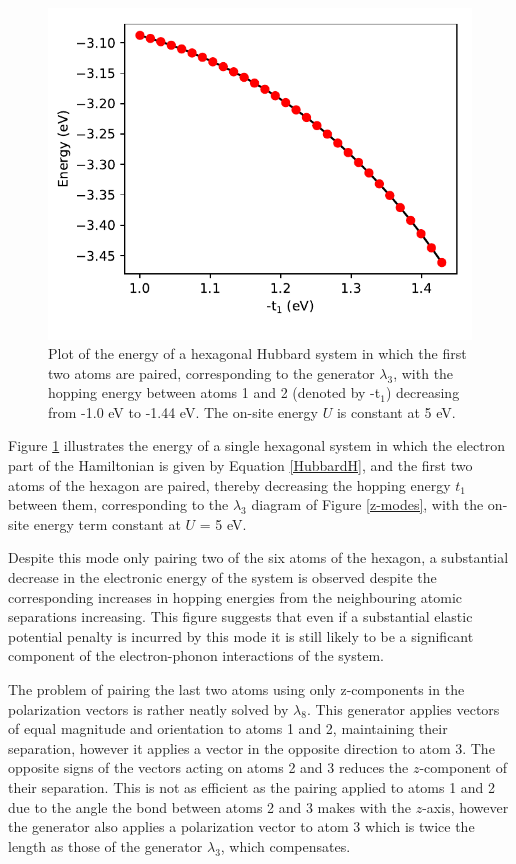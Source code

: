 \documentclass[prb,showpacs,superscriptaddress,titlepage,amsmath,amssymb,twocolumn]{revtex4-1}
\begin{document}
\begin{figure}
	\includegraphics[width=\columnwidth]{t1}
	\caption{Plot of the energy of a hexagonal Hubbard system in which the first two atoms are paired, corresponding to the generator $\lambda_{3}$, with the hopping energy between atoms 1 and 2 (denoted by -t$_{1}$) decreasing from -1.0 eV to -1.44 eV. The on-site energy $U$ is constant at 5 eV.}
	\label{t1}
\end{figure}

Figure \ref{t1} illustrates the energy of a single hexagonal system in which the electron part of the Hamiltonian is given by Equation \ref{HubbardH}, and the first two atoms of the hexagon are paired, thereby decreasing the hopping energy $t_{1}$ between them, corresponding to the $\lambda_{3}$ diagram of Figure \ref{z-modes}, with the on-site energy term constant at $U$ = 5 eV.  

Despite this mode only pairing two of the six atoms of the hexagon, a substantial decrease in the electronic energy of the system is observed despite the corresponding increases in hopping energies from the neighbouring atomic separations increasing. This figure suggests that even if a substantial elastic potential penalty is incurred by this mode it is still likely to be a significant component of the electron-phonon interactions of the system.

The problem of pairing the last two atoms using only z-components in the polarization vectors is rather neatly solved by $\lambda_{8}$. This generator applies vectors of equal magnitude and orientation to atoms 1 and 2, maintaining their separation, however it applies a vector in the opposite direction to atom 3. The opposite signs of the vectors acting on atoms 2 and 3 reduces the $z$-component of their separation. This is not as efficient as the pairing applied to atoms 1 and 2 due to the angle the bond between atoms 2 and 3 makes with the $z$-axis, however the generator also applies a polarization vector to atom 3 which is twice the length as those of the generator $\lambda_{3}$, which compensates.
\end{document}
